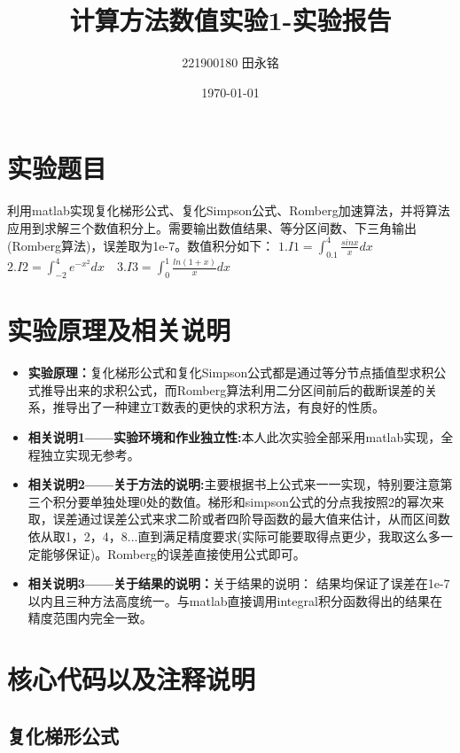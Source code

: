 \documentclass{LabReport}
\title{计算方法数值实验1-实验报告}
\author{221900180 田永铭}
\date{\today}
\begin{document}
	\maketitle
	
	\section{实验题目}
利用matlab实现复化梯形公式、复化Simpson公式、Romberg加速算法，并将算法应用到求解三个数值积分上。需要输出数值结果、等分区间数、下三角输出(Romberg算法)，误差取为1e-7。数值积分如下：
$1.I1 = \int_{0.1}^{4}\frac{sinx}{x} dx\quad$$2.I2 = \int_{-2}^{4}e^{-x^2} dx\quad$$3.I3 = \int_{0}^{1}\frac{ln(1+x)}{x} dx$


	\section{实验原理及相关说明}
	\begin{itemize}
		\item \textbf{实验原理：}复化梯形公式和复化Simpson公式都是通过等分节点插值型求积公式推导出来的求积公式，而Romberg算法利用二分区间前后的截断误差的关系，推导出了一种建立T数表的更快的求积方法，有良好的性质。
		\item \textbf{相关说明1——实验环境和作业独立性:}本人此次实验全部采用matlab实现，全程独立实现无参考。
		\item \textbf{相关说明2——关于方法的说明:}主要根据书上公式来一一实现，特别要注意第三个积分要单独处理0处的数值。梯形和simpson公式的分点我按照2的幂次来取，误差通过误差公式来求二阶或者四阶导函数的最大值来估计，从而区间数依从取1，2，4，8...直到满足精度要求(实际可能要取得点更少，我取这么多一定能够保证)。Romberg的误差直接使用公式即可。
		\item \textbf{相关说明3——关于结果的说明：}关于结果的说明：
		结果均保证了误差在1e-7以内且三种方法高度统一。与matlab直接调用integral积分函数得出的结果在精度范围内完全一致。
	\end{itemize}
	
	\section{核心代码以及注释说明}
	\subsection{复化梯形公式}
	
\end{document}
